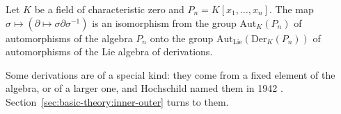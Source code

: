 \begin{theorem}\label{thm:basic:bavula}
Let $K$ be a field of characteristic zero and $P_n = K[x_1,\dots,x_n]$. The map
$\sigma \mapsto (\partial \mapsto \sigma\partial\sigma^{-1})$ is an
isomorphism from the group $\mathrm{Aut}_K(P_n)$ of automorphisms of the
algebra $P_n$ onto the group $\mathrm{Aut}_{\mathrm{Lie}}(\mathrm{Der}_K(P_n))$
of automorphisms of the Lie algebra of derivations.
\end{theorem}

Some derivations are of a special kind: they come from a fixed element of the
algebra, or of a larger one, and Hochschild named them in 1942
\cite[Definition~3.2, p.~689]{Hochschild1942}.
Section~\ref{sec:basic-theory:inner-outer} turns to them.
